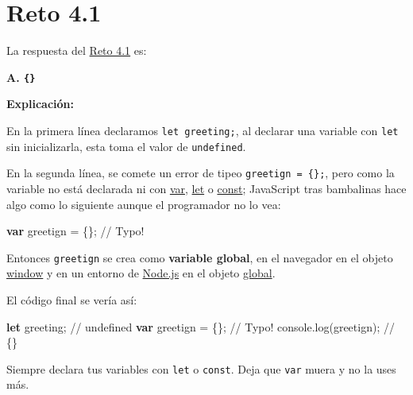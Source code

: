\documentclass[
  letterpaper,
  DIV=11,
  numbers=noendperiod]{scrreprt}
\newenvironment{Shaded}{\begin{snugshade}}{\end{snugshade}}
\newcommand{\BuiltInTok}[1]{\textcolor[rgb]{0.00,0.23,0.31}{#1}}
\newcommand{\CommentTok}[1]{\textcolor[rgb]{0.37,0.37,0.37}{#1}}
\newcommand{\FunctionTok}[1]{\textcolor[rgb]{0.28,0.35,0.67}{#1}}
\newcommand{\KeywordTok}[1]{\textcolor[rgb]{0.00,0.23,0.31}{\textbf{#1}}}
\newcommand{\NormalTok}[1]{\textcolor[rgb]{0.00,0.23,0.31}{#1}}
\newcommand{\OperatorTok}[1]{\textcolor[rgb]{0.37,0.37,0.37}{#1}}
\begin{document}
\section{Reto 4.1}\label{sec-sol-cap4-reto1}

La respuesta del \hyperref[sec-cap4-reto1]{Reto 4.1} es:

\textbf{A. \texttt{\{\}}}

\textbf{Explicación:}

En la primera línea declaramos \texttt{let\ greeting;}, al declarar una
variable con \texttt{let} sin inicializarla, esta toma el valor de
\texttt{undefined}.

En la segunda línea, se comete un error de tipeo
\texttt{greetign\ =\ \{\};}, pero como la variable no está declarada ni
con \hyperref[glos-var]{var}, \hyperref[glos-let]{let} o
\hyperref[glos-const]{const}; JavaScript tras bambalinas hace algo como
lo siguiente aunque el programador no lo vea:

\begin{Shaded}
\begin{Highlighting}[]
\KeywordTok{var}\NormalTok{ greetign }\OperatorTok{=}\NormalTok{ \{\}}\OperatorTok{;} \CommentTok{// Typo!}
\end{Highlighting}
\end{Shaded}

Entonces \texttt{greetign} se crea como \textbf{variable global}, en el
navegador en el objeto \hyperref[glos-window]{window} y en un entorno de
\hyperref[glos-nodejs]{Node.js} en el objeto
\hyperref[glos-global]{global}.

El código final se vería así:

\begin{Shaded}
\begin{Highlighting}[]
\KeywordTok{let}\NormalTok{ greeting}\OperatorTok{;} \CommentTok{// undefined}
\KeywordTok{var}\NormalTok{ greetign }\OperatorTok{=}\NormalTok{ \{\}}\OperatorTok{;} \CommentTok{// Typo!}
\BuiltInTok{console}\OperatorTok{.}\FunctionTok{log}\NormalTok{(greetign)}\OperatorTok{;} \CommentTok{// \{\}}
\end{Highlighting}
\end{Shaded}

\begin{tcolorbox}[enhanced jigsaw, left=2mm, toprule=.15mm, leftrule=.75mm, breakable, colback=white, coltitle=black, bottomtitle=1mm, arc=.35mm, rightrule=.15mm, colframe=quarto-callout-tip-color-frame, opacitybacktitle=0.6, toptitle=1mm, opacityback=0, titlerule=0mm, title=\textcolor{quarto-callout-tip-color}{\faLightbulb}\hspace{0.5em}{Tip}, bottomrule=.15mm, colbacktitle=quarto-callout-tip-color!10!white]

Siempre declara tus variables con \texttt{let} o \texttt{const}. Deja
que \texttt{var} muera y no la uses más.

\end{tcolorbox}
\end{document}
